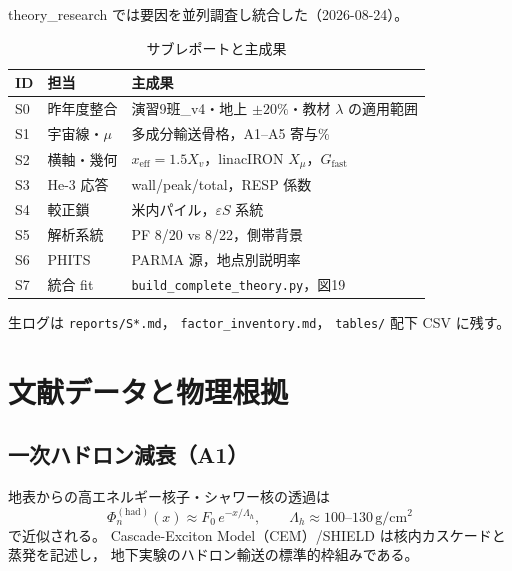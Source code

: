 \documentclass[a4paper,11pt]{ltjsarticle}
\begin{document}
theory\_research では要因を並列調査し統合した（2026-08-24）。

\begin{table}[htbp]
  \centering
  \caption{サブレポートと主成果}
  \begin{tabular}{llp{7.2cm}}
    \toprule
    ID & 担当 & 主成果 \\
    \midrule
    S0 & 昨年度整合 & 演習9班\_v4・地上 $\pm20\%$・教材 $\lambda$ の適用範囲 \\
    S1 & 宇宙線・$\mu$ & 多成分輸送骨格，A1--A5 寄与\% \\
    S2 & 横軸・幾何 & $x_{\mathrm{eff}}=1.5 X_v$，linacIRON $X_\mu$，$G_{\mathrm{fast}}$ \\
    S3 & He-3 応答 & wall/peak/total，RESP 係数 \\
    S4 & 較正鎖 & 米内パイル，$\varepsilon S$ 系統 \\
    S5 & 解析系統 & PF 8/20 vs 8/22，側帯背景 \\
    S6 & PHITS & PARMA 源，地点別説明率 \\
    S7 & 統合 fit & \texttt{build\_complete\_theory.py}，図19 \\
    \bottomrule
  \end{tabular}
\end{table}

生ログは \texttt{reports/S*.md}，
\texttt{factor\_inventory.md}，
\texttt{tables/} 配下 CSV に残す\cite{CONTEXT}。

\section{文献データと物理根拠}

\subsection{一次ハドロン減衰（A1）}

地表からの高エネルギー核子・シャワー核の透過は
\begin{equation}
  \Phi_n^{(\mathrm{had})}(x)
  \approx F_0\,e^{-x/\Lambda_h},
  \qquad
  \Lambda_h \approx 100\text{--}130\,\mathrm{g/cm^2}
\end{equation}
で近似される\cite{Gaisser2016,Gudima1983}。
Cascade-Exciton Model（CEM）/SHIELD は核内カスケードと蒸発を記述し\cite{Gudima1983,Toneev1983}，
地下実験のハドロン輸送の標準的枠組みである。
\end{document}
